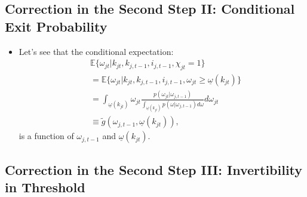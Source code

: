 \documentclass[
]{book}
\providecommand{\tightlist}{%
  \setlength{\itemsep}{0pt}\setlength{\parskip}{0pt}}
\begin{document}
\hypertarget{correction-in-the-second-step-ii-conditional-exit-probability}{%
\subsection{Correction in the Second Step II: Conditional Exit Probability}\label{correction-in-the-second-step-ii-conditional-exit-probability}}

\begin{itemize}
\tightlist
\item
  Let's see that the conditional expectation:
  \begin{equation}
  \begin{split}
  &\mathbb{E}\{\omega_{jt}| k_{jt},  k_{j, t - 1}, i_{j, t - 1}, \chi_{jt} = 1 \}\\
  &=\mathbb{E}\{\omega_{jt}| k_{jt}, k_{j, t - 1}, i_{j, t - 1}, \omega_{jt} \ge \underline{\omega}(k_{jt}) \}\\
  &=\int_{\underline{\omega}(k_{jt})} \omega_{jt} \frac{p(\omega_{jt}|\omega_{j, t - 1})}{\int_{\underline{\omega}(k_{jt})} p(\omega|\omega_{j, t - 1}) d\omega } d \omega_{jt}\\
  &\equiv \tilde{g}(\omega_{j, t - 1}, \underline{\omega}(k_{jt})),
  \end{split}
  \end{equation}
  is a function of \(\omega_{j, t - 1}\) and \(\underline{\omega}(k_{jt})\).
\end{itemize}

\hypertarget{correction-in-the-second-step-iii-invertibility-in-threshold}{%
\subsection{Correction in the Second Step III: Invertibility in Threshold}\label{correction-in-the-second-step-iii-invertibility-in-threshold}}
\end{document}
